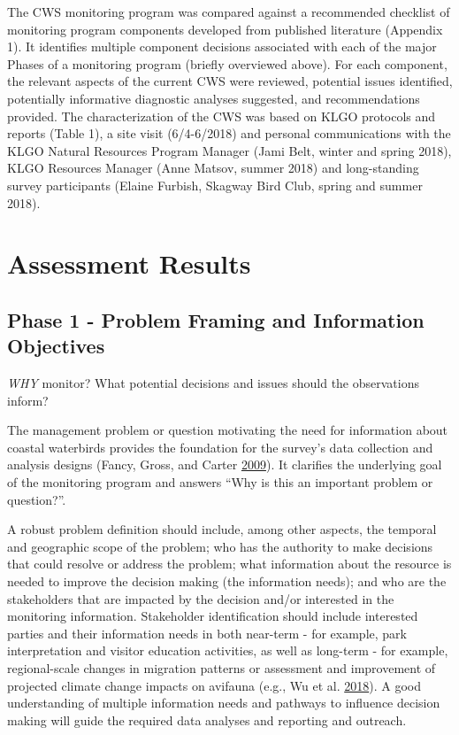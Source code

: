 \documentclass[]{article}
\begin{document}
The CWS monitoring program was compared against a recommended checklist
of monitoring program components developed from published literature
(Appendix 1). It identifies multiple component decisions associated with
each of the major Phases of a monitoring program (briefly overviewed
above). For each component, the relevant aspects of the current CWS were
reviewed, potential issues identified, potentially informative
diagnostic analyses suggested, and recommendations provided. The
characterization of the CWS was based on KLGO protocols and reports
(Table 1), a site visit (6/4-6/2018) and personal communications with
the KLGO Natural Resources Program Manager (Jami Belt, winter and spring
2018), KLGO Resources Manager (Anne Matsov, summer 2018) and
long-standing survey participants (Elaine Furbish, Skagway Bird Club,
spring and summer 2018).

\section{Assessment Results}\label{assessment-results}

\subsection{Phase 1 - Problem Framing and Information
Objectives}\label{phase-1---problem-framing-and-information-objectives}

\emph{WHY} monitor? What potential decisions and issues should the
observations inform?

The management problem or question motivating the need for information
about coastal waterbirds provides the foundation for the survey's data
collection and analysis designs (Fancy, Gross, and Carter
\protect\hyperlink{ref-Fancy2009}{2009}). It clarifies the underlying
goal of the monitoring program and answers ``Why is this an important
problem or question?''.

A robust problem definition should include, among other aspects, the
temporal and geographic scope of the problem; who has the authority to
make decisions that could resolve or address the problem; what
information about the resource is needed to improve the decision making
(the information needs); and who are the stakeholders that are impacted
by the decision and/or interested in the monitoring information.
Stakeholder identification should include interested parties and their
information needs in both near-term - for example, park interpretation
and visitor education activities, as well as long-term - for example,
regional-scale changes in migration patterns or assessment and
improvement of projected climate change impacts on avifauna (e.g., Wu et
al. \protect\hyperlink{ref-Wu2018}{2018}). A good understanding of
multiple information needs and pathways to influence decision making
will guide the required data analyses and reporting and outreach.
\end{document}
